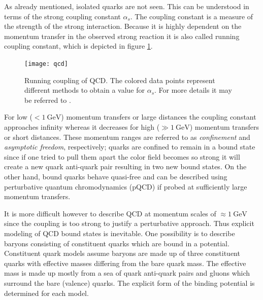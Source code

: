  As already mentioned, isolated quarks are not seen. This can be understood in terms of the strong coupling constant $\alpha_s$. The coupling constant is a measure of the strength of the strong interaction. Because it is highly dependent on the momentum transfer in the observed strong reaction it is also called running coupling constant, which is depicted in figure \ref{fig:coupl}.
 \begin{figure}
 	\centering
 	\texttt{[image: qcd]}
 	\caption{Running coupling of QCD. The colored data points represent different methods to obtain a value for $\alpha_s$. For more details it may be referred to \cite{pdg}.}
 	\label{fig:coupl}
 \end{figure}

 For low ($<\SI{1}{\GeV}$) momentum transfers or large distances the coupling constant approaches infinity whereas it decreases for high ($\gg\SI{1}{\GeV}$) momentum transfers or short distances. These momentum ranges are referred to as \emph{confinement} and \emph{asymptotic freedom}, respectively; quarks are confined to remain in a bound state since if one tried to pull them apart the color field becomes so strong it will create a new quark anti-quark pair resulting in two new bound states. On the other hand, bound quarks behave quasi-free and can be described using perturbative quantum chromodynamics (pQCD) if probed at sufficiently large momentum transfers.

 It is more difficult however to describe QCD at momentum scales of $\approx \SI{1}{\GeV}$ since the coupling is too strong to justify a perturbative approach. Thus explicit modeling of QCD bound states is inevitable. One possibility is to describe baryons consisting of constituent quarks which are bound in a potential. Constituent quark models assume baryons are made up of three constituent quarks with effective masses differing from the bare quark mass. The effective mass is made up mostly from a sea of quark anti-quark pairs and gluons which surround the bare (valence) quarks. The explicit form of the binding potential is determined for each model.

